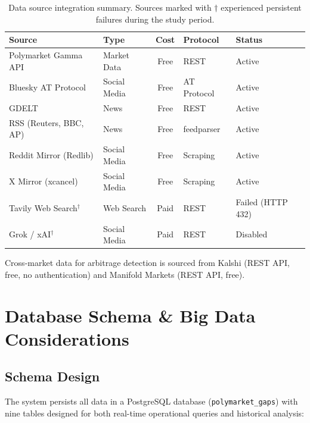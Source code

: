 \documentclass[12pt, letterpaper]{article}
\begin{document}
\begin{table}[H]
\centering
\caption{Data source integration summary. Sources marked with $\dagger$ experienced persistent failures during the study period.}
\label{tab:data_sources}
\begin{tabular}{@{}llcll@{}}
\toprule
\textbf{Source} & \textbf{Type} & \textbf{Cost} & \textbf{Protocol} & \textbf{Status} \\
\midrule
Polymarket Gamma API & Market Data & Free & REST & Active \\
Bluesky AT Protocol & Social Media & Free & AT Protocol & Active \\
GDELT & News & Free & REST & Active \\
RSS (Reuters, BBC, AP) & News & Free & feedparser & Active \\
Reddit Mirror (Redlib) & Social Media & Free & Scraping & Active \\
X Mirror (xcancel) & Social Media & Free & Scraping & Active \\
Tavily Web Search$^\dagger$ & Web Search & Paid & REST & Failed (HTTP 432) \\
Grok / xAI$^\dagger$ & Social Media & Paid & REST & Disabled \\
\bottomrule
\end{tabular}
\end{table}

Cross-market data for arbitrage detection is sourced from Kalshi (REST API, free, no authentication) and Manifold Markets (REST API, free).

\section{Database Schema \& Big Data Considerations}
\label{sec:database}

\subsection{Schema Design}

The system persists all data in a PostgreSQL database (\texttt{polymarket\_gaps}) with nine tables designed for both real-time operational queries and historical analysis:
\end{document}
